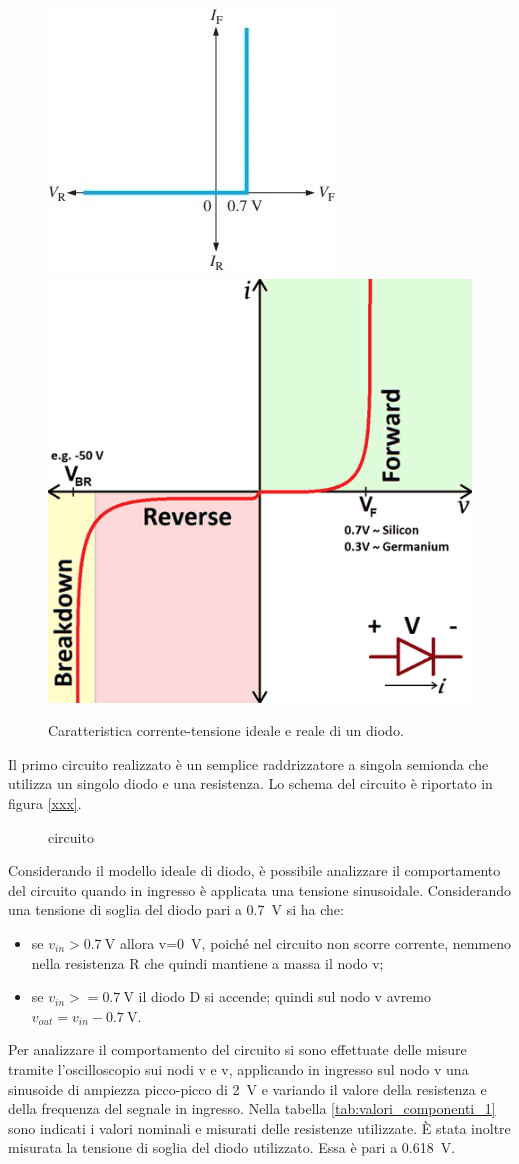 \begin{figure}[h]
	\centering
	\includegraphics[width=0.3\linewidth]{./ImageFiles/Laboratorio 2/diodo_2}
	\includegraphics[width=0.3\linewidth]{./ImageFiles/Laboratorio 2/diodo_3}
	\caption{Caratteristica corrente-tensione ideale e reale di un diodo.}
	\label{fig:diodo_caratteristica}
\end{figure}

Il primo circuito realizzato è un semplice raddrizzatore a singola semionda che utilizza un singolo diodo e una resistenza. Lo schema del circuito è riportato in figura \ref{xxx}.
\begin{figure}[h]
	\centering
	\caption{circuito}
\end{figure}
Considerando il modello ideale di diodo, è possibile analizzare il comportamento del circuito quando in ingresso è applicata una tensione sinusoidale. Considerando una tensione di soglia del diodo pari a \SI{0.7}{\volt} si ha che:
\begin{itemize}
	\item se $v_{in}>\SI{0.7}{\volt}$ allora v=\SI{0}{\volt}, poiché nel circuito non scorre corrente, nemmeno nella resistenza R che quindi mantiene a massa il nodo v;
	\item se $v_{in} >= \SI{0.7}{\volt}$ il diodo D si accende; quindi sul nodo v avremo $v_{out}=v_{in}-\SI{0.7}{\volt}$.
\end{itemize}
Per analizzare il comportamento del circuito si sono effettuate delle misure tramite l'oscilloscopio sui nodi v e v, applicando in ingresso sul nodo v una sinusoide di ampiezza picco-picco di \SI{2}{\volt} e variando il valore della resistenza e della frequenza del segnale in ingresso. Nella tabella \ref{tab:valori_componenti_1} sono indicati i valori nominali e misurati delle resistenze utilizzate. \`E stata inoltre misurata la tensione di soglia del diodo utilizzato. Essa è pari a \SI{0.618}{\volt}.

